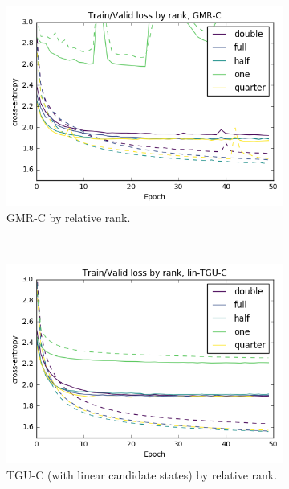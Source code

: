 \begin{figure}
\centering
\begin{subfigure}[t]{0.3\textwidth}
	\centering
	\includegraphics[width=\textwidth]{exps/wp/gmr}
	\caption{GMR-C by relative rank.}
\end{subfigure}~
\begin{subfigure}[t]{0.3\textwidth}
	\centering
	\includegraphics[width=\textwidth]{exps/wp/lintgu}
	\caption{TGU-C (with linear candidate states) by relative rank.}
\end{subfigure}~
\begin{subfigure}[t]{0.3\textwidth}
	\centering

\end{subfigure}
\end{figure}
